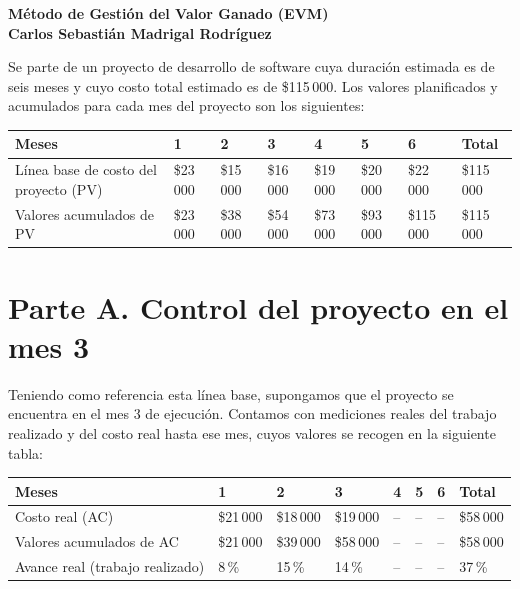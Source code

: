 \documentclass[12pt,letterpaper]{article}
\begin{document}
\onehalfspacing

\begin{center}
  {\large\bfseries Método de Gestión del Valor Ganado (EVM)}\\[0.6em]
{\large\bfseries Carlos Sebastián Madrigal Rodríguez}\\[0.8em]
\end{center}

Se parte de un proyecto de desarrollo de software
cuya duración estimada es de seis meses y cuyo costo total estimado es de
\$115\,000. Los valores planificados y acumulados para cada mes del proyecto son
los siguientes:

\begin{table}[htbp]
\centering
\small
\begin{tabularx}{\textwidth}{|>{\raggedright\arraybackslash}X|*{7}{C{1.7cm}|}}
\hline
{}
\color{white}\textbf{Meses} &
\color{white}\textbf{1} &
\color{white}\textbf{2} &
\color{white}\textbf{3} &
\color{white}\textbf{4} &
\color{white}\textbf{5} &
\color{white}\textbf{6} &
\color{white}\textbf{Total} \\
\hline
Línea base de costo del proyecto (PV) &
\$23\,000 & \$15\,000 & \$16\,000 & \$19\,000 & \$20\,000 & \$22\,000 & \$115\,000 \\
\hline
{}
Valores acumulados de PV &
\$23\,000 & \$38\,000 & \$54\,000 & \$73\,000 & \$93\,000 & \$115\,000 & \$115\,000 \\
\hline
\end{tabularx}
\end{table}

\section*{Parte A. Control del proyecto en el mes 3}

Teniendo como referencia esta línea base, supongamos que el proyecto se
encuentra en el mes 3 de ejecución. Contamos con mediciones reales del trabajo
realizado y del costo real hasta ese mes, cuyos valores se recogen en la
siguiente tabla:

\begin{table}[htbp]
\centering
\begin{tabularx}{\textwidth}{|>{\raggedright\arraybackslash}X|*{7}{C{1.7cm}|}}
\hline
{}
\color{white}\textbf{Meses} &
\color{white}\textbf{1} &
\color{white}\textbf{2} &
\color{white}\textbf{3} &
\color{white}\textbf{4} &
\color{white}\textbf{5} &
\color{white}\textbf{6} &
\color{white}\textbf{Total} \\
\hline
Costo real (AC) &
\$21\,000 & \$18\,000 & \$19\,000 & -- & -- & -- & \$58\,000 \\
\hline
{}
Valores acumulados de AC &
\$21\,000 & \$39\,000 & \$58\,000 & -- & -- & -- & \$58\,000 \\
\hline
Avance real (trabajo realizado) &
8\,\% & 15\,\% & 14\,\% & -- & -- & -- & 37\,\% \\
\hline
\end{tabularx}
\end{table}
\end{document}
